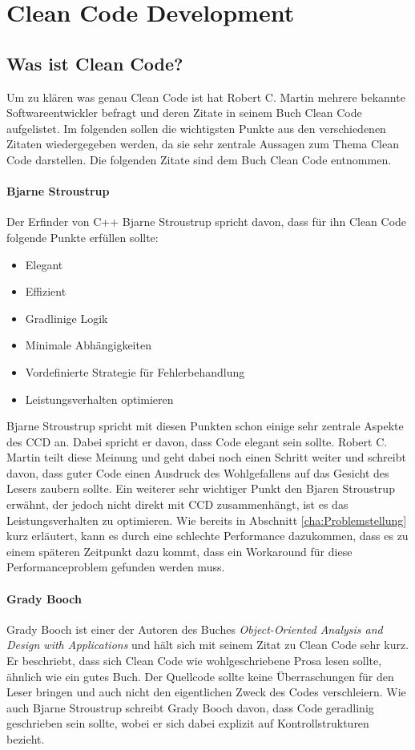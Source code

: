 \chapter{Clean Code Development}
\section{Was ist Clean Code?}
\label{cha:WhatIsCleanCode}

Um zu klären was genau Clean Code ist hat Robert C. Martin mehrere bekannte Softwareentwickler befragt und deren Zitate in seinem Buch Clean Code \cite{Martin2008} aufgelistet. Im folgenden sollen die wichtigsten Punkte aus den verschiedenen Zitaten wiedergegeben werden, da sie sehr zentrale Aussagen zum Thema Clean Code darstellen. Die folgenden Zitate sind dem Buch Clean Code \cite{Martin2008} entnommen.

\subsubsection{Bjarne Stroustrup}
Der Erfinder von C++ Bjarne Stroustrup spricht davon, dass für ihn Clean Code folgende Punkte erfüllen sollte:

\begin{itemize}
	\item Elegant
	\item Effizient
	\item Gradlinige Logik
	\item Minimale Abhängigkeiten
	\item Vordefinierte Strategie für Fehlerbehandlung
	\item Leistungsverhalten optimieren
\end{itemize}

Bjarne Stroustrup spricht mit diesen Punkten schon einige sehr zentrale Aspekte des CCD an. Dabei spricht er davon, dass Code elegant sein sollte. Robert C. Martin teilt diese Meinung und geht dabei noch einen Schritt weiter und schreibt davon, dass guter Code einen Ausdruck des Wohlgefallens auf das Gesicht des Lesers zaubern sollte. Ein weiterer sehr wichtiger Punkt den Bjaren Stroustrup erwähnt, der jedoch nicht direkt mit CCD zusammenhängt, ist es das Leistungsverhalten zu optimieren. Wie bereits in Abschnitt \ref{cha:Problemstellung} kurz erläutert, kann es durch eine schlechte Performance dazukommen, dass es zu einem späteren Zeitpunkt dazu kommt, dass ein Workaround für diese Performanceproblem gefunden werden muss.

\subsubsection{Grady Booch}
Grady Booch ist einer der Autoren des Buches \textit{Object-Oriented Analysis and Design with Applications} \cite{Booch2004} und hält sich mit seinem Zitat zu Clean Code sehr kurz. Er beschriebt, dass sich Clean Code wie wohlgeschriebene Prosa lesen sollte, ähnlich wie ein gutes Buch. Der Quellcode sollte keine Überraschungen für den Leser bringen und auch nicht den eigentlichen Zweck des Codes verschleiern. Wie auch Bjarne Stroustrup schreibt Grady Booch davon, dass Code geradlinig geschrieben sein sollte, wobei er sich dabei explizit auf Kontrollstrukturen bezieht.

